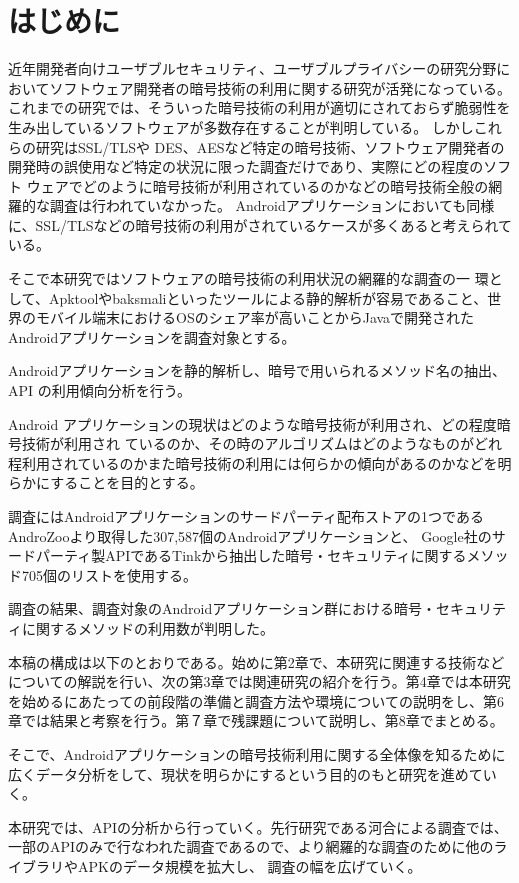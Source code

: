 \newpage
\section{はじめに} 
近年開発者向けユーザブルセキュリティ、ユーザブルプライバシーの研究分野においてソフトウェア開発者の暗号技術の利用に関する研究が活発になっている。
これまでの研究では、そういった暗号技術の利用が適切にされておらず脆弱性を生み出しているソフトウェアが多数存在することが判明している。
しかしこれらの研究はSSL/TLSや DES、AESなど特定の暗号技術、ソフトウェア開発者の開発時の誤使用など特定の状況に限った調査だけであり、実際にどの程度のソフト
ウェアでどのように暗号技術が利用されているのかなどの暗号技術全般の網羅的な調査は行われていなかった。
Androidアプリケーションにおいても同様に、SSL/TLSなどの暗号技術の利用がされているケースが多くあると考えられている。

そこで本研究ではソフトウェアの暗号技術の利用状況の網羅的な調査の一
環として、Apktoolやbaksmaliといったツールによる静的解析が容易であること、世界のモバイル端末におけるOSのシェア率が高いこと\cite{share}からJavaで開発されたAndroidアプリケーションを調査対象とする。


Androidアプリケーションを静的解析し、暗号で用いられるメソッド名の抽出、API の利用傾向分析を行う。

Android アプリケーションの現状はどのような暗号技術が利用され、どの程度暗号技術が利用され
ているのか、その時のアルゴリズムはどのようなものがどれ程利用されているのかまた暗号技術の利用には何らかの傾向があるのかなどを明らかにすることを目的とする。


調査にはAndroidアプリケーションのサードパーティ配布ストアの1つであるAndroZooより取得した307,587個のAndroidアプリケーションと、
Google社のサードパーティ製APIであるTinkから抽出した暗号・セキュリティに関するメソッド705個のリストを使用する。



調査の結果、調査対象のAndroidアプリケーション群における暗号・セキュリティに関するメソッドの利用数が判明した。


本稿の構成は以下のとおりである。始めに第2章で、本研究に関連する技術などについての解説を行い、次の第3章では関連研究の紹介を行う。第4章では本研究を始めるにあたっての前段階の準備と調査方法や環境についての説明をし、第6章では結果と考察を行う。第７章で残課題について説明し、第8章でまとめる。



そこで、Androidアプリケーションの暗号技術利用に関する全体像を知るために広くデータ分析をして、現状を明らかにするという目的のもと研究を進めていく。


本研究では、APIの分析から行っていく。先行研究である河合による調査では、一部のAPIのみで行なわれた調査であるので、より網羅的な調査のために他のライブラリやAPKのデータ規模を拡大し、
調査の幅を広げていく。
\fi